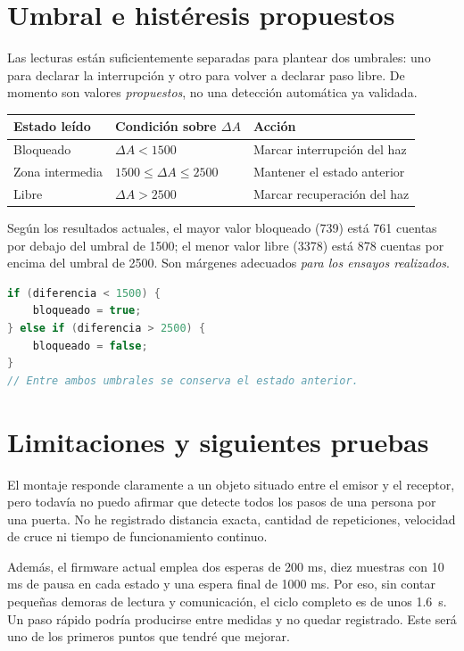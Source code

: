 \documentclass[11pt,a4paper]{article}
\begin{document}
\section{Umbral e histéresis propuestos}
Las lecturas están suficientemente separadas para plantear dos umbrales: uno para declarar la interrupción y otro para volver a declarar paso libre. De momento son valores \emph{propuestos}, no una detección automática ya validada.
\begin{center}
\begin{tabularx}{\linewidth}{@{}XlX@{}}
\toprule
Estado leído & Condición sobre $\Delta A$ & Acción\\
\midrule
Bloqueado & $\Delta A<1500$ & Marcar interrupción del haz\\
Zona intermedia & $1500\leq\Delta A\leq2500$ & Mantener el estado anterior\\
Libre & $\Delta A>2500$ & Marcar recuperación del haz\\
\bottomrule
\end{tabularx}
\end{center}

Según los resultados actuales, el mayor valor bloqueado (739) está 761 cuentas por debajo del umbral de 1500; el menor valor libre (3378) está 878 cuentas por encima del umbral de 2500. Son márgenes adecuados \emph{para los ensayos realizados}.

\begin{lstlisting}[language=C++,caption={Logica de estado que se propone probar a continuacion.}]
if (diferencia < 1500) {
    bloqueado = true;
} else if (diferencia > 2500) {
    bloqueado = false;
}
// Entre ambos umbrales se conserva el estado anterior.
\end{lstlisting}

\section{Limitaciones y siguientes pruebas}
El montaje responde claramente a un objeto situado entre el emisor y el receptor, pero todavía no puedo afirmar que detecte todos los pasos de una persona por una puerta. No he registrado distancia exacta, cantidad de repeticiones, velocidad de cruce ni tiempo de funcionamiento continuo.

Además, el firmware actual emplea dos esperas de 200 ms, diez muestras con 10 ms de pausa en cada estado y una espera final de 1000 ms. Por eso, sin contar pequeñas demoras de lectura y comunicación, el ciclo completo es de unos \SI{1.6}{\second}. Un paso rápido podría producirse entre medidas y no quedar registrado. Este será uno de los primeros puntos que tendré que mejorar.
\end{document}
